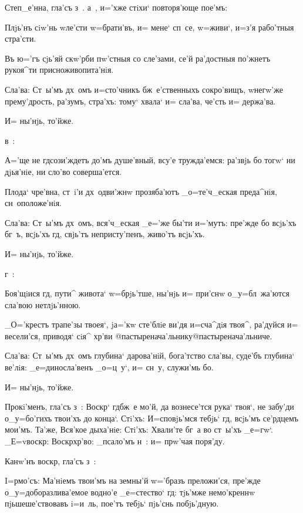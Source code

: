 Степ_е'нна, гла'съ з~.  а~, и='хже стiхи` 
повторя'юще пое'мъ:

Плjь'нъ сiw'нь w\т ле'сти w=брати'въ, и= мене` сп~се, 
w=живи`, и=з'я рабо'тныя стра'сти.

Въ ю='гъ сjь'яй скw'рби пw'стныя со сле'зами, се'й 
ра'достныя по'жнетъ рукоя^ти присноживопита'нiя.

Сла'ва: Ст~ы'мъ дх~омъ и=сто'чникъ бж~е'ственныхъ 
сокро'вищъ, w\т негw'же прему'дрость, ра'зумъ, стра'хъ: 
тому` хвала` и= сла'ва, че'сть и= держа'ва.

И= ны'нjь, то'йже.

 в~:

А='ще не гд сози'ждетъ до'мъ душе'вный, всу'е 
тружда'емся: ра'звjь бо тогw` ни дjья'нiе, ни сло'во 
соверша'ется.

Плода` чре'вна, ст~i'и дх~одви'жнw прозяба'ютъ 
_о=те'ч_еская преда^нiя, сн~оположе'нiя.

Сла'ва: Ст~ы'мъ дх~омъ, вся'ч_еская _е='же бы'ти 
и='мутъ: пре'жде бо всjь'хъ бг~ъ, всjь'хъ гд, 
свjь'тъ непристу'пенъ, живо'тъ всjь'хъ.

И= ны'нjь, то'йже.

 г~:

Боя'щiися гд, пути^ живота` w=брjь'тше, ны'нjь и= 
при'снw о_у=бл~жа'ются сла'вою нетлjь'нною.

_О='крестъ трапе'зы твоея`, jа='кw сте'блiе ви'дя 
и=сча^дiя твоя^, ра'дуйся и= весели'ся, приводя` сiя^ 
хр'ви @пастыренача'льнику@{пастыренача'льниче}.

Сла'ва: Ст~ы'мъ дх~омъ глубина` дарова'нiй, бога'тство 
сла'вы, суде'бъ глубина` ве'лiя: _е=диносла'венъ _о=ц~у`, 
и= сн~у, служи'мь бо.

И= ны'нjь, то'йже.

Прокi'менъ, гла'съ з~: Воскр` гд бж~е мо'й, да 
вознесе'тся рука` твоя`, не забу'ди о_у=бо'гихъ твои'хъ 
до конца`. Стi'хъ: И=сповjь'мся тебjь` гд, всjь'мъ 
се'рдцемъ мои'мъ. Та'же, Вся'кое дыха'нiе: Стi'хъ: 
Хвали'те бг~а во ст~ы'хъ _е=гw`. _Е=v воскр: 
Воскр хр'во: _псало'мъ н~: и= прw'чая поря'ду.

Канw'нъ воскр, гла'съ з~:


I=рмо'съ: Ма'нiемъ твои'мъ на земны'й w='бразъ 
преложи'ся, пре'жде о_у=доборазлива'емое водно'е 
_е=стество` гд: тjь'мже немо'креннw пjьшеше'ствовавъ 
i=и~ль, пое'тъ тебjь` пjь'снь побjь'дную.

